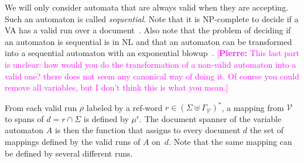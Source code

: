 \documentclass[12px]{article}
\theoremstyle{definition}
\newcommand{\pierre}[1]{\textcolor{magenta}{[\textbf{Pierre:} #1]}}
\begin{document}


        We will only consider automata that are always valid when they
        are accepting.
        Such an automaton is called \textit{sequential}. Note that it is
        NP-complete to decide if a VA has a valid run over a
        document~\cite{freydenberger:LIPIcs:2017}. Also note that the problem
        of deciding if an automaton is sequential is in NL and that an
        automaton can be transformed into a sequential automaton with an
        exponential blowup~\cite{ICDT19}. \pierre{This last part is
        unclear: how would you do the transformation of a non-valid
        automaton into a valid one? there does not seem any canonical way
        of doing it. Of course you could remove all variables, but I
        don't think this is what you mean.}

        From each valid run $\rho$ labeled by a ref-word $r \in {(\Sigma \uplus
        \Gamma_\mathcal{V})}^*$, a mapping from $\mathcal{V}$ to spans of $d =
        r \cap \Sigma$ is defined by $\mu^r$. The document spanner of the
        variable automaton $A$ is then the function that assigns to every
        document $d$ the set of mappings defined by the valid runs of $A$
        on~$d$. Note that the same mapping can be defined by several different
        runs.
\end{document}
